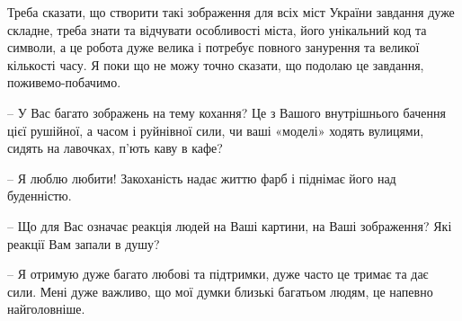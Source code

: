 Треба сказати, що створити такі зображення для всіх міст України завдання дуже
складне, треба знати та відчувати особливості міста, його унікальний код та
символи, а це робота дуже велика і потребує повного занурення та великої
кількості часу. Я поки що не можу точно сказати, що подолаю це завдання,
поживемо-побачимо.

– У Вас багато зображень на тему кохання? Це з Вашого внутрішнього бачення цієї
рушійної, а часом і руйнівної сили, чи ваші «моделі» ходять вулицями, сидять на
лавочках, п’ють каву в кафе?

– Я люблю любити! Закоханість надає життю фарб і піднімає його над буденністю.


– Що для Вас означає реакція людей на Ваші картини, на Ваші зображення? Які
реакції Вам запали в душу?

– Я отримую дуже багато любові та підтримки, дуже часто це тримає та дає сили.
Мені дуже важливо, що мої думки близькі багатьом людям, це напевно
найголовніше.
